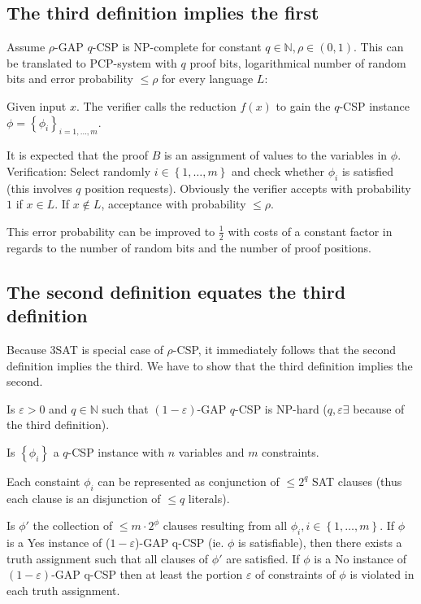 \documentclass[a4paper]{article}
\newcommand{\cls}[1]{\rm{#1}}
\newcommand{\set}[1]{\left\{#1\right\}}
\begin{document}
\subsection{The third definition implies the first}
%
Assume $\rho$-GAP $q$-CSP is \cls{NP}-complete for constant $q \in \mathbb{N},
\rho \in (0,1)$. This can be translated to PCP-system with $q$ proof bits,
logarithmical number of random bits and error probability $\leq \rho$ for
every language $L$:

Given input $x$. The verifier calls the reduction $f(x)$ to gain the
$q$-CSP instance $\phi = \set{\phi_i}_{i=1,\ldots,m}$.

It is expected that the proof $B$ is an assignment of values to the
variables in $\phi$. Verification: Select randomly $i \in \set{1,\ldots,m}$
and check whether $\phi_i$ is satisfied (this involves $q$ position requests).
Obviously the verifier accepts with probability $1$ if $x \in L$.
If $x \notin L$, acceptance with probability $\leq \rho$.

This error probability can be improved to $\frac12$ with costs of a constant
factor in regards to the number of random bits and the number of proof
positions.

\subsection{The second definition equates the third definition}
%
Because 3SAT is special case of $\rho$-CSP, it immediately follows
that the second definition implies the third. We have to show that
the third definition implies the second.

Is $\varepsilon > 0$ and $q \in \mathbb{N}$ such that
$(1 - \varepsilon)$-GAP $q$-CSP is \cls{NP}-hard ($q, \varepsilon \exists$
because of the third definition).

Is $\set{\phi_i}$ a $q$-CSP instance with $n$ variables and $m$ constraints.

Each constaint $\phi_i$ can be represented as conjunction of $\leq 2^q$
SAT clauses (thus each clause is an disjunction of $\leq q$ literals).

Is $\phi'$ the collection of $\leq m \cdot 2^\phi$ clauses resulting from
all $\phi_i, i \in \set{1,\ldots,m}$. If $\phi$ is a Yes instance of
($1-\varepsilon$)-GAP q-CSP (ie. $\phi$ is satisfiable), then there exists
a truth assignment such that all clauses of $\phi'$ are satisfied.
If $\phi$ is a No instance of $(1-\varepsilon)$-GAP q-CSP then at least
the portion $\varepsilon$ of constraints of $\phi$ is violated in each
truth assignment.
\end{document}
